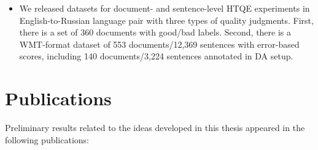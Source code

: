 \begin{itemize}
	\item We released datasets for document- and sentence-level \gls{HTQE} experiments in English-to-Russian language pair with three types of quality judgments. First, there is a set of 360 documents with good/bad labels. Second, there is a \gls{WMT}-format dataset of 553 documents/12,369 sentences with error-based scores, including 140 documents/3,224 sentences annotated in DA setup.

\end{itemize}

\section{\label{sec:papers}Publications}
Preliminary results related to the ideas developed in this thesis appeared in the following publications:
